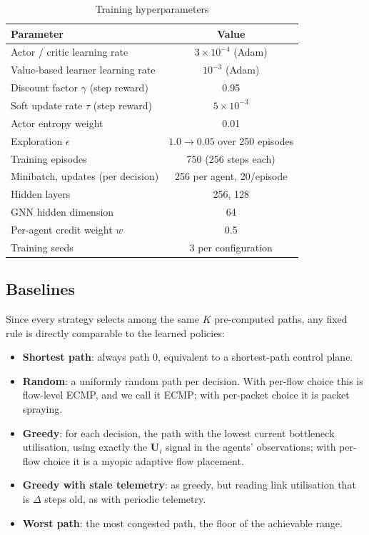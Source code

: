 \documentclass[10pt,journal,comsoc]{IEEEtran}
\begin{document}
\begin{table}[!t]
  \centering
  \caption{Training hyperparameters}
  \label{tab:training_params}
  \begin{tabular}{lc}
    \toprule
    \textbf{Parameter} & \textbf{Value} \\
    \midrule
    Actor / critic learning rate & $3\times10^{-4}$ (Adam) \\
    Value-based learner learning rate & $10^{-3}$ (Adam) \\
    Discount factor $\gamma$ (step reward) & 0.95 \\
    Soft update rate $\tau$ (step reward) & $5\times10^{-3}$ \\
    Actor entropy weight & 0.01 \\
    Exploration $\epsilon$ & $1.0 \rightarrow 0.05$ over 250 episodes \\
    Training episodes & 750 (256 steps each) \\
    Minibatch, updates (per decision) & 256 per agent, 20/episode \\
    Hidden layers & 256, 128 \\
    GNN hidden dimension & 64 \\
    Per-agent credit weight $w$ & 0.5 \\
    Training seeds & 3 per configuration \\
    \bottomrule
  \end{tabular}
\end{table}

\subsection{Baselines}
\label{subsec:baselines}
Since every strategy selects among the same $K$ pre-computed paths, any fixed rule is directly comparable to the learned policies:
\begin{itemize}
  \item \textbf{Shortest path}: always path $0$, equivalent to a shortest-path control plane.
  \item \textbf{Random}: a uniformly random path per decision. With per-flow choice this is flow-level ECMP, and we call it ECMP; with per-packet choice it is packet spraying.
  \item \textbf{Greedy}: for each decision, the path with the lowest current bottleneck utilisation, using exactly the $\mathbf{U}_i$ signal in the agents' observations; with per-flow choice it is a myopic adaptive flow placement.
  \item \textbf{Greedy with stale telemetry}: as greedy, but reading link utilisation that is $\Delta$ steps old, as with periodic telemetry.
  \item \textbf{Worst path}: the most congested path, the floor of the achievable range.
\end{itemize}
\end{document}
